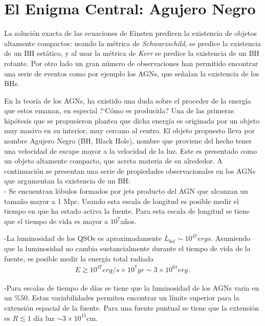 \section{El Enigma Central: Agujero Negro}
\label{sec: Enigma_centarl}

La solución exacta de las ecuaciones de Einsten predicen la existencia de objetos altamente compactos: usando la métrica de {\it{Schwarzschild}}, se predice la existencia de un BH estático, y al usar la métrica de {\it{Kerr}} se predice la existencia de un BH rotante. Por otro lado un gran número de observaciones han permitido encontrar una serie de eventos como por ejemplo los AGNs, que señalan  la existencia de los BHs. 

En la teoría de los AGNs, ha existido una duda sobre el proceder de la energía que estos emanan, en especial ?`Cómo es producida? Una de las primeras hipótesis que se propusieron plantea que dicha energía es originada por un objeto muy masivo en su interior, muy cercano al centro. El objeto propuesto lleva por nombre  Agujero Negro (BH, Black Hole), nombre que proviene del hecho tener una velocidad de escape mayor a la velocidad de la luz. Este es presentado como un objeto altamente compacto, que acreta materia de su alrededor. A continuación se presentan una serie de propiedades observacionales en los AGNs que argumentan la existencia de un BH: \\

- Se encuentran lóbulos formados por jets producto del AGN
que alcanzan un tamaño  mayor a 1 Mpc. Usando esta escala de longitud es posible medir el tiempo en que ha estado activa la fuente. Para esta escala de longitud se tiene que el tiempo de vida es mayor a $10^{7}$años.

-La luminosidad de los QSOs es aproximadamente $L_{bol}\sim 10^{47}ergs$. Asumiendo que la luminosidad no cambia sustancialmente durante el tiempo de vida de la fuente, es posible medir la energía total radiada
\begin{align}
E \gtrsim 10^{47} erg/s \times 10^{7}yr \sim 3\times 10^{61}erg\,.
\end{align}

-Para escalas de tiempo de días se tiene que la luminosidad de los AGNs varia en un $\% 50$. Estas variabilidades permiten encontrar un límite superior para la extensión espacial de la fuente. Para una fuente puntual se tiene que la extensión es $R \lesssim 1$ día luz $\sim3\times10^{15}$cm.\\


